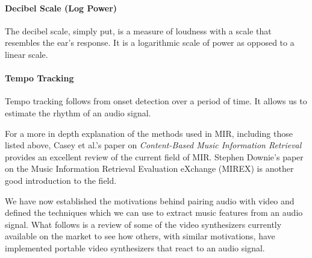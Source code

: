 \documentclass[../initial_thesis.tex]{subfiles}
\begin{document}
\paragraph{Decibel Scale (Log Power)}
The decibel scale, simply put, is a measure of loudness with a scale that resembles the ear's response. It is a logarithmic scale of power as opposed to a linear scale.

\paragraph{Tempo Tracking}
Tempo tracking follows from onset detection over a period of time. It allows us to estimate the rhythm of an audio signal.\\
\par

For a more in depth explanation of the methods used in MIR, including those listed above, Casey et al.'s paper on \textit{Content-Based Music Information Retrieval} \cite{Casey2008} provides an excellent review of the current field of MIR. Stephen Downie's paper \cite{Downie} on the Music Information Retrieval Evaluation eXchange (MIREX) is another good introduction to the field. \par

We have now established the motivations behind pairing audio with video and defined the techniques which we can use to extract music features from an audio signal. What follows is a review of some of the video synthesizers currently available on the market to see how others, with similar motivations, have implemented portable video synthesizers that react to an audio signal.

\end{document}
